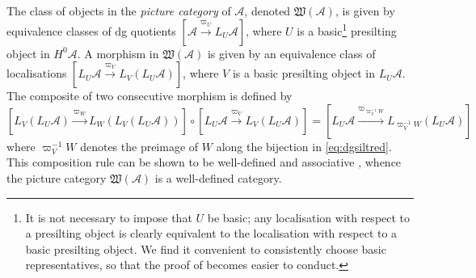 \documentclass[10pt,twoside, a4paper,reqno]{amsart}
\newcommand{\tcmc}[1]{\mathfrak{W}(#1)}
\newcommand{\A}{\mathscr{A}}
\theoremstyle{definition}
\begin{document}
The class of objects in the \textit{picture category} of $\A$, denoted $\tcmc{\A}$, is given by equivalence classes of dg quotients $[\A \xrightarrow{\varpi_{U}} {L_U\A}]$, where $U$ is a basic\footnote{It is not necessary to impose that $U$ be basic; any localisation with respect to a presilting object is clearly equivalent to the localisation with respect to a basic presilting object. We find it convenient to consistently choose basic representatives, so that the proof of  becomes easier to conduct.} presilting object in $H^0\A$. A morphism in $\tcmc{\A}$ is given by an equivalence class of localisations $[{L_U\A} \xrightarrow{\varpi_{V}} {L_V(L_U\A)}]$, where $V$ is a basic presilting object in ${L_U\A}$. The composite of two consecutive morphism is defined by
\begin{equation}\label{eq:comp_tcmc}
    [{L_V(L_U\A)} \xrightarrow{\varpi_W} {L_W(L_V(L_U\A))} ]\circ [{L_U\A} \xrightarrow{\varpi_V} {L_V(L_U\A)}]=[{L_U\A} \xrightarrow{\varpi_{\varpi_V^{-1}W}} {L_{\varpi_V^{-1}W}(L_U\A)}]
\end{equation}
where $\varpi_V^{-1}W$ denotes the preimage of $W$ along the bijection in \eqref{eq:dgsiltred}. This composition rule can be shown to be well-defined \cite[§6.2]{Bor24} and associative \cite[{Prop.} 6.3]{Bor24}, whence the picture category $\tcmc{\A}$ is a well-defined category. 
\end{document}
